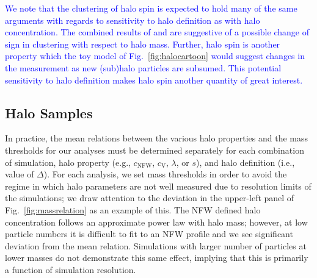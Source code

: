 \documentclass[usenatbib,fleqn]{mnras}
\begin{document}
\textcolor{blue}{We note that the clustering of halo spin is expected to hold many of the same arguments with regards to sensitivity to halo definition as with halo concentration. The combined results of \citet{bett_etal07} and \cite{lacerna_padilla11} are suggestive of a possible change of sign in clustering with respect to halo mass. Further, halo spin is another property which the toy model of Fig.~\ref{fig:halocartoon} would suggest changes in the measurement as new (sub)halo particles are subsumed. This potential sensitivity to halo definition makes halo spin another quantity of great interest.}

\subsection{Halo Samples}

In practice, the mean relations between the various halo properties and the mass 
thresholds for our analyses must be determined separately for each combination of simulation, halo property (e.g., $c_{\mathrm{NFW}}$, $c_{\mathrm{V}}$, $\lambda$, or $s$), and halo definition (i.e., value of $\Delta$). For each analysis, we set mass thresholds in order to avoid the regime in which halo parameters are not well measured due to resolution limits of the simulations; we draw attention to the deviation in the upper-left panel of Fig.~\ref{fig:massrelation} as an example of this. The NFW defined halo concentration follows an approximate power law with halo mass; however, at low particle numbers it is difficult to fit to an NFW profile and we see significant deviation from the mean relation. Simulations with larger number of particles at lower masses do not demonstrate this same effect, implying that this is primarily a function of simulation resolution.
\end{document}
